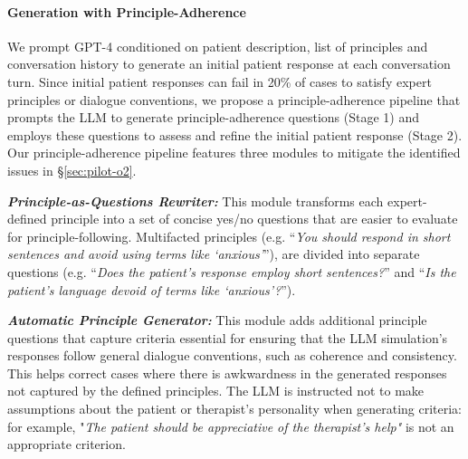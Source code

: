 \documentclass[11pt]{article}
\begin{document}
\paragraph{Generation with Principle-Adherence}
We prompt GPT-4 conditioned on patient description, list of principles and conversation history to generate an initial patient response at each conversation turn. Since initial patient responses can fail in 20\% of cases to satisfy expert principles or dialogue conventions, we propose a principle-adherence pipeline that prompts the LLM to generate principle-adherence questions (Stage 1) and employs these questions to assess and refine the initial patient response (Stage 2). 
Our principle-adherence pipeline features three modules to mitigate the identified issues in \S\ref{sec:pilot-o2}. 

\textbf{\textit{Principle-as-Questions Rewriter:}} This module transforms each expert-defined principle into a set of concise yes/no questions that are easier to evaluate for principle-following. Multifacted principles (e.g. “\emph{You should respond in short sentences and avoid using terms like ‘anxious’}”), are divided into separate questions (e.g. “\emph{Does the patient’s response employ short sentences?}” and “\emph{Is the patient’s language devoid of terms like ‘anxious’?}”). %

\textbf{\textit{Automatic Principle Generator:}}
This module adds additional principle questions that capture criteria essential for ensuring that the LLM simulation's responses follow general dialogue conventions, such as coherence and consistency. This helps correct cases where there is awkwardness in the generated responses not captured by the defined principles. The LLM is instructed not to make assumptions about the patient or therapist's personality when generating criteria: for example, "\emph{The patient should be appreciative of the therapist's help"} is not an appropriate criterion.
\end{document}
